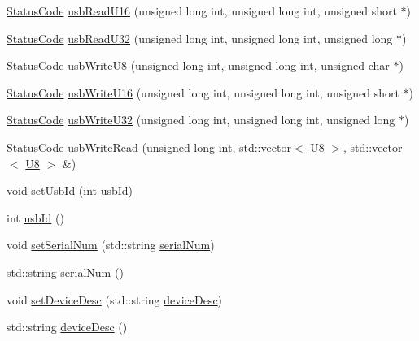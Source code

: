 \begin{DoxyCompactItemize}
\item 
\hyperlink{classStatusCode}{Status\+Code} \hyperlink{classUsbFTInterface_ae17381a2ca14b9acac9faa10c3e430db}{usb\+Read\+U16} (unsigned long int, unsigned long int, unsigned short $\ast$)
\item 
\hyperlink{classStatusCode}{Status\+Code} \hyperlink{classUsbFTInterface_a7eadb8a94323fada4c72ed1c992792cc}{usb\+Read\+U32} (unsigned long int, unsigned long int, unsigned long $\ast$)
\item 
\hyperlink{classStatusCode}{Status\+Code} \hyperlink{classUsbFTInterface_a8aeebce6a10aa88c19cfa663b47b389a}{usb\+Write\+U8} (unsigned long int, unsigned long int, unsigned char $\ast$)
\item 
\hyperlink{classStatusCode}{Status\+Code} \hyperlink{classUsbFTInterface_aa37ff87bb675d1671ee7a92ee83500b9}{usb\+Write\+U16} (unsigned long int, unsigned long int, unsigned short $\ast$)
\item 
\hyperlink{classStatusCode}{Status\+Code} \hyperlink{classUsbFTInterface_ac5eac42e444c9b0f19f0f70598c51b20}{usb\+Write\+U32} (unsigned long int, unsigned long int, unsigned long $\ast$)
\item 
\hyperlink{classStatusCode}{Status\+Code} \hyperlink{classUsbFTInterface_aa477927996bd05aeee185c192ef9a68e}{usb\+Write\+Read} (unsigned long int, std\+::vector$<$ \hyperlink{classUsbFTInterface_a3b007566f8af758984d97ada2b9938d3}{U8} $>$, std\+::vector$<$ \hyperlink{classUsbFTInterface_a3b007566f8af758984d97ada2b9938d3}{U8} $>$ \&)
\item 
void \hyperlink{classUsbFTInterface_a6718c98c2b6d5924b6722e81f93f25f0}{set\+Usb\+Id} (int \hyperlink{classUsbFTInterface_a2a63b462eb5831b4aef9d0f4c8d6ee1a}{usb\+Id})
\item 
int \hyperlink{classUsbFTInterface_a2a63b462eb5831b4aef9d0f4c8d6ee1a}{usb\+Id} ()
\item 
void \hyperlink{classUsbFTInterface_aaabe44c3b717a98e7571de296085c3a4}{set\+Serial\+Num} (std\+::string \hyperlink{classUsbFTInterface_ab4a2aa9664e903c57ae396faf643e7a3}{serial\+Num})
\item 
std\+::string \hyperlink{classUsbFTInterface_ab4a2aa9664e903c57ae396faf643e7a3}{serial\+Num} ()
\item 
void \hyperlink{classUsbFTInterface_abb106a3d2c48826f96ec2ac10d029132}{set\+Device\+Desc} (std\+::string \hyperlink{classUsbFTInterface_af353796fd68a869ea5c8e753aa65dc2c}{device\+Desc})
\item 
std\+::string \hyperlink{classUsbFTInterface_af353796fd68a869ea5c8e753aa65dc2c}{device\+Desc} ()

\end{DoxyCompactItemize}
